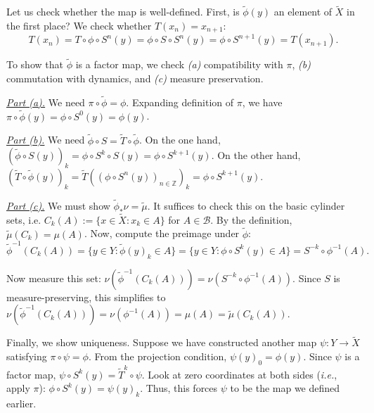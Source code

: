 \documentclass{template}
\begin{document}
Let us check whether the map is well-defined. First, is $\widetilde{\phi}(y)$ 
an element of $\widetilde{X}$ in the first place? We check whether $T(x_n)=x_{n+1}$:
\begin{equation*}
    T(x_n) = T \circ \phi \circ S^n(y) = \phi \circ S \circ S^n(y) = \phi \circ S^{n+1}(y) = T(x_{n+1}).
\end{equation*}

To show that $\widetilde{\phi}$ is a factor map, we check \textit{(a)} compatibility with $\pi$,
\textit{(b)} commutation with dynamics, and \textit{(c)} measure preservation.

\underline{\textit{Part (a).}} We need $\pi \circ \widetilde{\phi} = \phi$. Expanding
definition of $\pi$, we have $\pi \circ \widetilde{\phi}(y) = \phi \circ S^0(y) = \phi(y)$.

\underline{\textit{Part (b).}} We need $\widetilde{\phi} \circ S = \widetilde{T} \circ \widetilde{\phi}$.
On the one hand, $(\widetilde{\phi} \circ S(y))_k = \phi \circ S^k \circ S(y) = \phi \circ S^{k+1}(y)$.
On the other hand, $(\widetilde{T} \circ \widetilde{\phi}(y))_k = \widetilde{T}((\phi \circ S^n(y))_{n \in \mathbb{Z}})_k = \phi \circ S^{k+1}(y)$.

\underline{\textit{Part (c).}} We must show $\widetilde{\phi}_*\nu =
\widetilde{\mu}$. It suffices to check this on the basic cylinder sets, i.e.
$C_k(A) := \{x \in \widetilde{X}: x_k \in A\}$ for $A \in \mathcal{B}$.
By the definition, $\widetilde{\mu}(C_k) = \mu(A)$. Now, compute the preimage
under $\widetilde{\phi}$:
\begin{equation*}
    \widetilde{\phi}^{-1}(C_k(A)) = \{y \in Y: \widetilde{\phi}(y)_k \in A\} = \{y \in Y: \phi \circ S^k(y) \in A\} = S^{-k} \circ \phi^{-1}(A).
\end{equation*}

Now measure this set: $\nu(\widetilde{\phi}^{-1}(C_k(A))) = \nu(S^{-k} \circ \phi^{-1}(A))$. Since $S$ is measure-preserving,
this simplifies to $\nu(\widetilde{\phi}^{-1}(C_k(A))) = \nu(\phi^{-1}(A)) = \mu(A) = \widetilde{\mu}(C_k(A))$.

Finally, we show uniqueness. Suppose we have constructed another map $\psi: Y \to \widetilde{X}$ satisfying $\pi \circ \psi = \phi$.
From the projection condition, $\psi(y)_0 = \phi(y)$. Since $\psi$ is a factor map,
$\psi \circ S^k(y) = \widetilde{T}^k \circ \psi$. Look at zero coordinates 
at both sides (\textit{i.e.}, apply $\pi$): $\phi \circ S^k(y) = \psi(y)_k$.
Thus, this forces $\psi$ to be the map we defined earlier.
\end{document}
